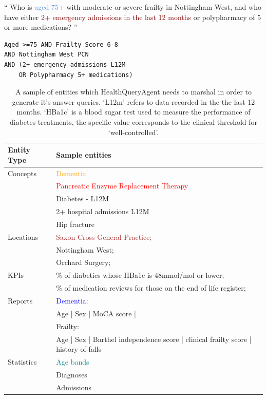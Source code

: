 \documentclass[11pt]{article}
\begin{document}
\enquote{
Who is \textcolor{CornflowerBlue}{aged 75+} with \textcolor{Rhodamine}{moderate or severe frailty} in \textcolor{OliveGreen}{Nottingham West}, and who have either \textcolor{Maroon}{2+ emergency admissions in the last 12 months} or \textcolor{PineGreen}{polypharmacy of 5 or more medications?}
}

\begin{verbatim}
Aged >=75 AND Frailty Score 6-8
AND Nottingham West PCN
AND (2+ emergency admissions L12M
	OR Polypharmacy 5+ medications)

\end{verbatim}

\begin{table}[t]
\centering
	\begin{tabular}{|p{2cm}|p{5cm}|}
\hline
	Entity Type & Sample entities \\

\hline
\hline
	Concepts 	& \textcolor{orange}{Dementia} \\
	 	        & \textcolor{red}{Pancreatic Enzyme Replacement Therapy} \\
			& Diabetes - L12M \\
			& 2+ hospital admissions L12M \\
			& Hip fracture \\ 
\hline
	Locations	& \textcolor{brown}{Saxon Cross General Practice;}\\	
			& Nottingham West; \\
			& Orchard Surgery; \\
\hline
	KPIs		& \% of diabetics whose HBa1c is 48mmol/mol or lower; \\
	 		& \% of medication reviews for those on the end of life register; \\	
\hline
	Reports		& \textcolor{blue}{Dementia:} \\
			& Age | Sex | MoCA score | \\
			& Frailty: \\
			& Age | Sex | Barthel independence score | clinical frailty score | history of falls \\
\hline
	Statistics	& \textcolor{teal}{Age bands} \\
			& Diagnoses \\
			& Admissions \\
\hline
\end{tabular}

\caption{
	A sample of entities which HealthQueryAgent needs to marshal in order to generate it's answer queries.
	`L12m' refers to data recorded in the the last 12 months.
	`HBa1c' is a blood sugar test used to measure the performance of diabetes treatments, the specific value corresponds to the clinical threshold for `well-controlled'.
}
	\label{tab:sample-entities}
\end{table}
\end{document}
